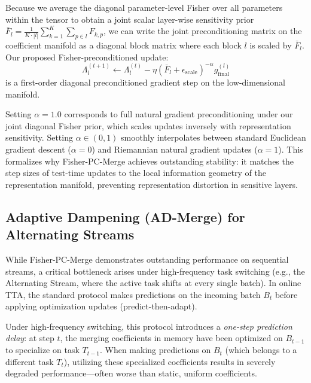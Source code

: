 \documentclass{article}
\theoremstyle{plain}
\theoremstyle{definition}
\theoremstyle{remark}
\begin{document}
Because we average the diagonal parameter-level Fisher over all parameters within the tensor to obtain a joint scalar layer-wise sensitivity prior $\bar{F}_l = \frac{1}{K \cdot |l|} \sum_{k=1}^K \sum_{p \in l} F_{k, p}$, we can write the joint preconditioning matrix on the coefficient manifold as a diagonal block matrix where each block $l$ is scaled by $\bar{F}_l$. Our proposed Fisher-preconditioned update:
\begin{equation}
    \label{eq:fisher_pc_merge_update}
    \Lambda^{(t+1)}_l \leftarrow \Lambda^{(t)}_l - \eta (\bar{F}_l + \epsilon_{\text{scale}})^{-\alpha} g^{(l)}_{\text{final}}
\end{equation}
is a first-order diagonal preconditioned gradient step on the low-dimensional manifold. 

Setting $\alpha = 1.0$ corresponds to full natural gradient preconditioning under our joint diagonal Fisher prior, which scales updates inversely with representation sensitivity. Setting $\alpha \in (0, 1)$ smoothly interpolates between standard Euclidean gradient descent ($\alpha = 0$) and Riemannian natural gradient updates ($\alpha = 1$). This formalizes why Fisher-PC-Merge achieves outstanding stability: it matches the step sizes of test-time updates to the local information geometry of the representation manifold, preventing representation distortion in sensitive layers.

\subsection{Adaptive Dampening (AD-Merge) for Alternating Streams}
\label{subsec:ad_merge}
While Fisher-PC-Merge demonstrates outstanding performance on sequential streams, a critical bottleneck arises under high-frequency task switching (e.g., the Alternating Stream, where the active task shifts at every single batch). In online TTA, the standard protocol makes predictions on the incoming batch $B_t$ before applying optimization updates (predict-then-adapt). 

Under high-frequency switching, this protocol introduces a \emph{one-step prediction delay}: at step $t$, the merging coefficients in memory have been optimized on $B_{t-1}$ to specialize on task $T_{t-1}$. When making predictions on $B_t$ (which belongs to a different task $T_t$), utilizing these specialized coefficients results in severely degraded performance---often worse than static, uniform coefficients.
\end{document}
